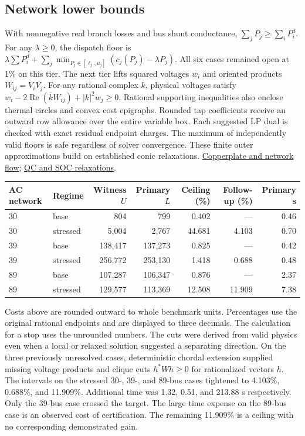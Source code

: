 \documentclass[10pt,letterpaper]{article}
\begin{document}
\subsection{Network lower bounds}
With nonnegative real branch losses and bus shunt conductance, $\sum_jP_j\geq\sum_iP_i^d$. For any $\lambda\ge0$, the dispatch floor is $\lambda\sum P_i^d +\sum_j\min_{P_j\in[\ell_j,u_j]}(c_j(P_j)-\lambda P_j)$. All six cases remained open at 1\% on this tier. The next tier lifts squared voltages $w_i$ and oriented products $W_{ij}=V_i\overline{V_j}$. For any rational complex $k$, physical voltages satisfy $w_i-2\operatorname{Re}(\bar k W_{ij})+|k|^2w_j\ge0$. Rational supporting inequalities also enclose thermal circles and convex cost epigraphs. Rounded tap coefficients receive an outward row allowance over the entire variable box. Each suggested LP dual is checked with exact residual endpoint charges. The maximum of independently valid floors is safe regardless of solver convergence. These finite outer approximations build on established conic relaxations. \href{https://arxiv.org/abs/1506.05202}{Copperplate and network flow}; \href{https://arxiv.org/abs/1502.07847}{QC and SOC relaxations}.
\begin{center}\small\begin{tabular}{llrrrrr}\toprule
AC network & Regime & Witness $U$ & Primary $L$ & Ceiling (\%) & Follow-up (\%) & Primary s\\\midrule
30 & base & 804 & 799 & 0.402 & --- & 0.46\\
30 & stressed & 5,004 & 2,767 & 44.681 & 4.103 & 0.70\\
39 & base & 138,417 & 137,273 & 0.825 & --- & 0.42\\
39 & stressed & 256,772 & 253,130 & 1.418 & 0.688 & 0.48\\
89 & base & 107,287 & 106,347 & 0.876 & --- & 2.37\\
89 & stressed & 129,577 & 113,369 & 12.508 & 11.909 & 7.38\\
\bottomrule\end{tabular}\end{center}
Costs above are rounded outward to whole benchmark units. Percentages use the original rational endpoints and are displayed to three decimals. The calculation for a stop uses the unrounded numbers. The cuts were derived from valid physics even when a local or relaxed solution suggested a separating direction. On the three previously unresolved cases, deterministic chordal extension supplied missing voltage products and clique cuts $h^*Wh\ge0$ for rationalized vectors $h$. The intervals on the stressed 30-, 39-, and 89-bus cases tightened to 4.103\%, 0.688\%, and 11.909\%. Additional time was 1.32, 0.51, and 213.88 s respectively. Only the 39-bus case crossed the target. The large time expense on the 89-bus case is an observed cost of certification. The remaining 11.909\% is a ceiling with no corresponding demonstrated gain.
\end{document}
